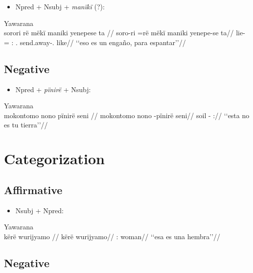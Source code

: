 \documentclass{memoir}
\begin{document}
\begin{itemize}
\tightlist
\item
  Npred + Nsubj + \emph{manïkï} (?):
\end{itemize}

\ex Yawarana \\
\label{ctovarmafl-315}    \begingl
    \glpreamble sorori rë mëkï maniki yenepese ta //
    \gla soro-ri =rë mëkï maniki yenepe-se ta//
    \glb lie- = : . send.away-. like//
        \glft ‘‘eso es un engaño, para espantar’’//  
    \endgl 
\xe

\subsection{Negative}

\begin{itemize}
\tightlist
\item
  Npred + \emph{pïnirë} + Nsubj:
\end{itemize}

\ex Yawarana \\
\label{convamgu-42}    \begingl
    \glpreamble mokontomo nono pïnirë seni //
    \gla mokontomo nono -pïnirë seni//
    \glb {} soil - ://
        \glft ‘‘esta no es tu tierra’’//  
    \endgl 
\xe

\section{Categorization}

\subsection{Affirmative}

\begin{itemize}
\tightlist
\item
  Nsubj + Npred:
\end{itemize}

\ex Yawarana \\
\label{hist2mape-21}    \begingl
    \glpreamble kërë wurijyamo //
    \gla kërë wurijyamo//
    \glb {}: woman//
        \glft ‘‘esa es una hembra’’//  
    \endgl 
\xe

\subsection{Negative}
\end{document}
